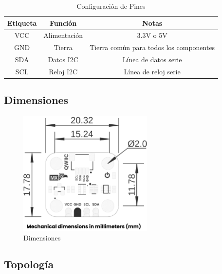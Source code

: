 \documentclass[11pt,a4paper]{article}
\begin{document}
\begin{table}[H]
\centering
\small
\begin{tabular}{|c|c|c|}
\hline
Etiqueta & Función & Notas \\
\hline
VCC & Alimentación & 3.3V o 5V \\
GND & Tierra & Tierra común para todos los componentes \\
SDA & Datos I2C & Línea de datos serie \\
SCL & Reloj I2C & Línea de reloj serie \\
\hline
\end{tabular}
\caption{Configuración de Pines}
\end{table}


\subsection{Dimensiones}


\begin{figure}[H]
\centering
\includegraphics[width=0.6\textwidth]{es_unit_dimension_v_1_0_0_icp10111_barometric_pressure_sensor.png}
\caption{Dimensiones}
\label{fig:es-unit-dimension-v-1-0-0-icp10111-barometric-pressure-sensor-png}
\end{figure}



\subsection{Topología}
\end{document}
